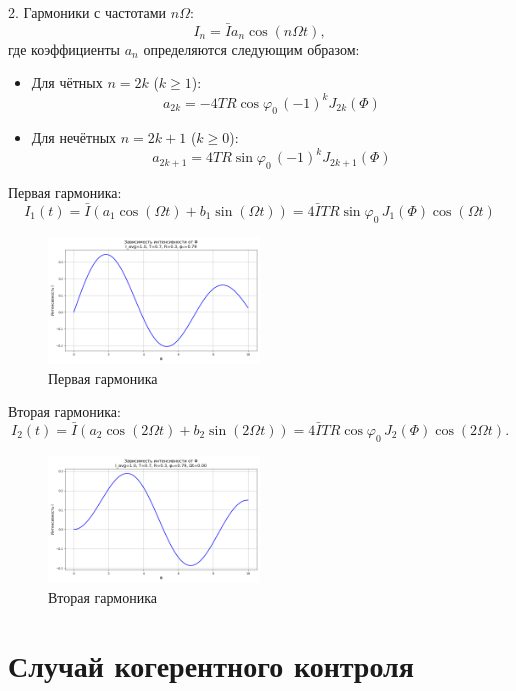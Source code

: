 \documentclass[a4paper, 12pt]{article}
\renewcommand{\phi}{\varphi}
\begin{document}
2. Гармоники с частотами \(n\Omega\):
\[
  I_n = \bar{I} a_n \cos(n\Omega t),
\]
где коэффициенты \(a_n\) определяются следующим образом:
\begin{itemize}
  \item Для чётных \(n = 2k\) (\(k \geq 1\)):
        \[
          a_{2k} = -4 T R \cos\phi_0 \, (-1)^k J_{2k}(\Phi)
        \]
  \item Для нечётных \(n = 2k+1\) (\(k \geq 0\)):
        \[
          a_{2k+1} = 4 T R \sin\phi_0 \, (-1)^k J_{2k+1}(\Phi)
        \]
\end{itemize}

Первая гармоника:
\[
  I_1(t) = \bar{I} \left(a_1 \cos(\Omega t) + b_1 \sin(\Omega t)\right) = 4\bar{I}TR \sin\phi_0 \, J_1(\Phi) \cos(\Omega t)
\]

\begin{figure}[H]
  \centering
  \includegraphics[width=0.5\textwidth]{../figures/bessel_intensity_I1.0_T0.7_R0.3_phi0.79.png}
  \caption{Первая гармоника}
\end{figure}

Вторая гармоника:
\[
  I_2(t) = \bar{I} \left(a_2 \cos(2\Omega t) + b_2 \sin(2\Omega t)\right) = 4\bar{I}TR \cos\phi_0 \, J_2(\Phi) \cos(2\Omega t).
\]

\begin{figure}[H]
  \centering
  \includegraphics[width=0.5\textwidth]{../figures/bessel2_intensity_I1.0_T0.7_R0.3_phi0.79_Omega0.00.png}
  \caption{Вторая гармоника}
  \label{fig:bessel2_intensity_I1.0_T0.7_R0.3_phi0.00_Omega0.00}
\end{figure}

\section{Случай когерентного контроля}
\end{document}

